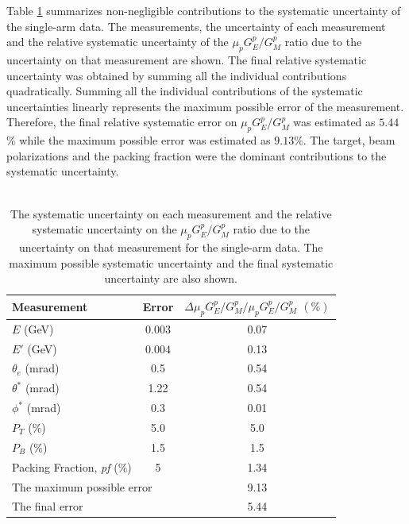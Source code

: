 \documentclass[12pt]{article}
\begin{document}
Table \ref{tabsys} summarizes non-negligible contributions to the systematic uncertainty of the single-arm data. The measurements, the uncertainty of each measurement and the relative systematic uncertainty of the  $\mu_p G_E^p/G_M^p$ ratio due to the uncertainty on that measurement are shown. The final relative systematic uncertainty was obtained by summing all the individual contributions quadratically. Summing all the individual contributions of the systematic uncertainties linearly represents the maximum possible error of the measurement. Therefore, the final relative systematic error on $\mu_p G_E^p/G_M^p$ was estimated as $5.44$$\%$ while the maximum possible error was estimated as $9.13$$\%$. The target, beam polarizations and the packing fraction were the dominant contributions to the systematic uncertainty.
\\~
  \begin{table}[htbp]
   \centering
   \begin{tabular}{|l|c|c|} 
      \hline
         Measurement              & Error                                                 & $\Delta \mu_p G_E^p/G_M^p / \mu_p G_E^p/G_M^p$ $(\%)$  \\
      \hline
      $E$ (GeV)             &  $0.003$                             &   0.07   \\
      $E'$ (GeV)                 &  $0.004$                              &    0.13   \\      
      $\theta_e$ (mrad)      &   0.5                                    &    0.54   \\          
      $\theta^*$ (mrad)       &   1.22                                                         &    0.54          \\
      $\phi^*$ (mrad)          &    0.3                                                        &     0.01         \\      
      $P_T$   ($\%$)                          &  5.0                                           &    5.0    \\
      $P_B$     ($\%$)                        & 1.5                                            &   1.5     \\
      Packing Fraction, \emph{pf}   ($\%$)                                 &  5 &   1.34   \\
      \hline
      \multicolumn{2}{|l|}{The maximum possible error}                                                          &   9.13    \\
      \hline
      \multicolumn{2}{|l|}{The final error}                                                          &   5.44    \\
      \hline      
  \end{tabular}
   \caption{ The systematic uncertainty on each measurement and the relative systematic uncertainty on the $\mu_p G_E^p/G_M^p$ ratio due to the uncertainty on that measurement for the single-arm data. The maximum possible systematic uncertainty and the final systematic uncertainty  are also shown.}
   \label{tabsys}
   \end{table}
\end{document}
